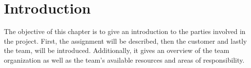 \chapter{Introduction}
The objective of this chapter is to give an introduction to the parties involved in the project. First, the assignment will be described, then the customer and lastly the team, will be introduced.
Additionally, it gives an overview of the team organization as well as the team's available resources and areas of responsibility.





\newpage

